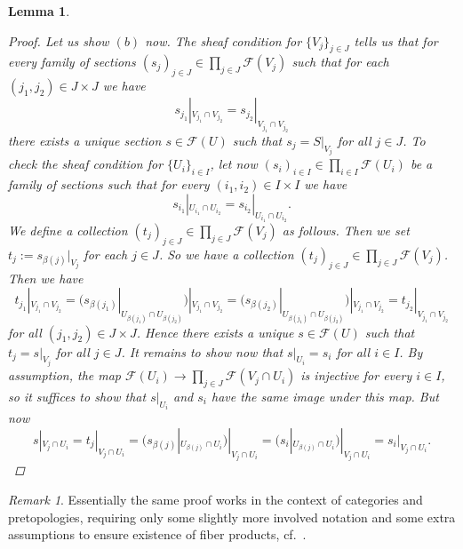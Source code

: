 \documentclass[12pt,a4paper]{amsart}
\theoremstyle{plain}
\newtheorem{lm}[thm]{Lemma}
\theoremstyle{definition}
\theoremstyle{remark}
\newtheorem{rem}[thm]{Remark}
\begin{document}
\begin{lm}
\begin{proof}
    Let us show $(b)$ now.
    The sheaf condition for $\{ V_{j} \}_{j \in J}$ tells us that for every family of sections $(s_{j})_{j \in J} \in \prod_{j \in J} \mathscr{F}(V_{j})$ such that for each $(j_{1},j_{2}) \in J \times J$ we have
    \[ s_{j_{1}}|_{V_{j_{1}} \cap V_{j_{2}}} = s_{j_{2}}|_{V_{j_{1}} \cap V_{j_{2}}} \]
    there exists a unique section $s \in \mathscr{F}(U)$ such that $s_{j} = S|_{V_{j}}$ for all $j \in J$.
    To check the sheaf condition for $\{ U_{i} \}_{i \in I}$, let now $(s_{i})_{i \in I} \in \prod_{i \in I}\mathscr{F}(U_{i})$ be a family of sections such that for every $(i_{1}, i_{2}) \in I \times I$ we have
    \[ s_{i_{1}}|_{U_{i_{1}} \cap U_{i_{2}}} = s_{i_{2}}|_{U_{i_{1}} \cap U_{i_{2}}}. \]
    We define a collection $(t_{j})_{j \in J} \in \prod_{j \in J} \mathscr{F}(V_{j})$ as follows.
    Then we set $t_{j} := s_{\beta(j)}|_{V_{j}}$ for each $j \in J$.
    So we have a collection $(t_{j})_{j \in J} \in \prod_{j \in J} \mathscr{F}(V_{j})$.
    Then we have
    \[ t_{j_{1}}|_{V_{j_{1}} \cap V_{j_{2}}} = (s_{\beta(j_{1})}|_{U_{\beta(j_{1})} \cap U_{\beta(j_{2})}})|_{V_{j_{1}} \cap V_{j_{2}}} = (s_{\beta(j_{2})}|_{U_{\beta(j_{1})} \cap U_{\beta(j_{2})}})|_{V_{j_{1}} \cap V_{j_{2}}} = t_{j_{2}}|_{V_{j_{1}} \cap V_{j_{2}}} \]
    for all $(j_{1}, j_{2}) \in J \times J$.
    Hence there exists a unique $s \in \mathscr{F}(U)$ such that $t_{j} = s|_{V_{j}}$ for all $j \in J$.
    It remains to show now that $s|_{U_{i}} = s_{i}$ for all $i \in I$.
    By assumption, the map $\mathscr{F}(U_{i}) \to \prod_{j \in J} \mathscr{F}(V_{j} \cap U_{i})$ is injective for every $i \in I$, so it suffices to show that $s|_{U_{i}}$ and $s_{i}$ have the same image under this map.
    But now
    \[ s|_{V_{j} \cap U_{i}} = t_{j}|_{V_{j} \cap U_{i}} = (s_{\beta(j)}|_{U_{\beta(j)} \cap U_{i}})|_{V_{j} \cap U_{i}} = (s_{i}|_{U_{\beta(j)} \cap U_{i}})|_{V_{j} \cap U_{i}} = s_{i}|_{V_{j} \cap U_{i}}. \]
  \end{proof}
\end{lm}

\begin{rem}
  Essentially the same proof works in the context of categories and pretopologies, requiring only some slightly more involved notation and some extra assumptions to ensure existence of fiber products, cf.~\cite[\href{https://stacks.math.columbia.edu/tag/0G1L}{Tag 0G1L}]{stacks-project}.
\end{rem}
\end{document}
